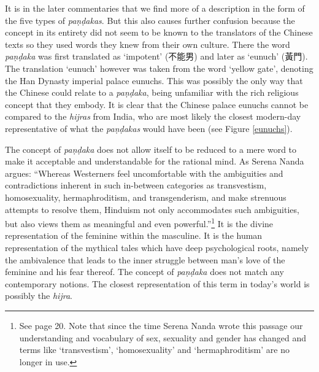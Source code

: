 It is in the later commentaries that we find more of a description in the form of the five types of {\em paṇḍakas}. But this also causes further confusion because the concept in its entirety did not seem to be known to the translators of the Chinese texts so they used words they knew from their own culture. There the word {\em paṇḍaka} was first translated as `impotent' (不能男) and later as `eunuch' (黃門). The translation `eunuch' however was taken from the word `yellow gate', denoting the Han Dynasty imperial palace eunuchs. This was possibly the only way that the Chinese could relate to a {\em paṇḍaka}, being unfamiliar with the rich religious concept that they embody. It is clear that the Chinese palace eunuchs cannot be compared to the {\em hijras} from India, who are most likely the closest modern-day representative of what the {\em paṇḍakas} would have been (see Figure \ref{eunuchs}).

The concept of {\em paṇḍaka} does not allow itself to be reduced to a mere word to make it acceptable and understandable for the rational mind. As Serena Nanda argues: ``Whereas Westerners feel uncomfortable with the ambiguities and contradictions inherent in such in-between categories as transvestism, homosexuality, hermaphroditism, and transgenderism, and make strenuous attempts to resolve them, Hinduism not only accommodates such ambiguities, but also views them as meaningful and even powerful.''\footnote{See \cite{nanda} page 20. Note that since the time Serena Nanda wrote this passage our understanding and vocabulary of sex, sexuality and gender has changed and terms like `transvestism', `homosexuality' and `hermaphroditism' are no longer in use.} It is the divine representation of the feminine within the masculine. It is the human representation of the mythical tales which have deep psychological roots, namely the ambivalence that leads to the inner struggle between man's love of the feminine and his fear thereof. The concept of {\em paṇḍaka} does not match any contemporary notions. The closest representation of this term in today's world is possibly the {\em hijra}.
